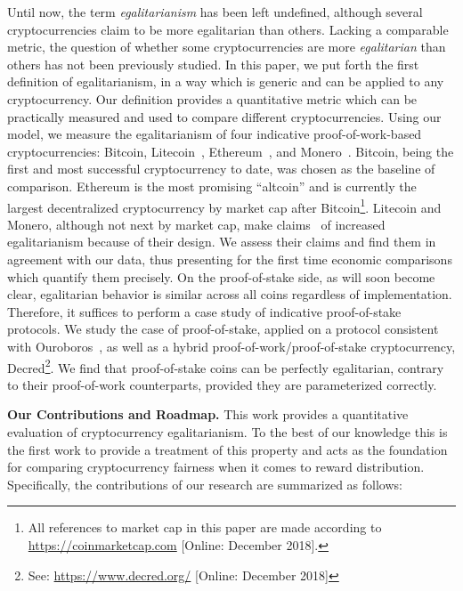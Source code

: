 Until now, the term \emph{egalitarianism} has been left undefined, although
several cryptocurrencies claim to be more egalitarian than others.
Lacking a comparable metric, the question of whether some cryptocurrencies are
more \emph{egalitarian} than others has not been previously studied. In this paper, we
put forth the first definition of egalitarianism, in a way which is
generic and can be applied to any cryptocurrency.
Our definition provides a quantitative metric which can be practically measured and used
to compare different cryptocurrencies.
Using our model, we measure the egalitarianism of
four indicative proof-of-work-based
cryptocurrencies: Bitcoin, Litecoin~\cite{lee2011litecoin}, Ethereum~\cite{wood2014ethereum}, and Monero~\cite{van2013cryptonote}. Bitcoin, being the first and most successful cryptocurrency to date, was chosen as
the baseline of comparison. Ethereum is the most promising ``altcoin'' and is currently the largest decentralized cryptocurrency by market cap after Bitcoin\footnote{All references to market cap in this paper are made according to \url{https://coinmarketcap.com} [Online: December 2018].}.
Litecoin and Monero, although not next by market cap,
make claims~\cite{van2013cryptonote,mcmillan2013} of increased egalitarianism because of their design.
We assess their claims and find them in agreement with our data, thus presenting for the first time economic comparisons which quantify them precisely.
On the proof-of-stake side, as will soon become clear, egalitarian
behavior is similar across all coins regardless of implementation. Therefore,
it suffices to perform a case study of indicative proof-of-stake protocols.
We study the case of proof-of-stake, applied on a protocol consistent with Ouroboros~\cite{C:KRDO17},
as well as a hybrid proof-of-work/proof-of-stake cryptocurrency,
Decred\footnote{See: \url{https://www.decred.org/} [Online: December 2018]}. We find that proof-of-stake coins can be perfectly
egalitarian, contrary to their proof-of-work counterparts, provided they are parameterized correctly.

\noindent
\textbf{Our Contributions and Roadmap.}
This work provides a quantitative evaluation of cryptocurrency egalitarianism.
To the best of our knowledge this is the first work to provide a
treatment of this property and acts as the foundation for comparing
cryptocurrency fairness when it comes to reward distribution.
Specifically, the contributions of our research are summarized as follows:


